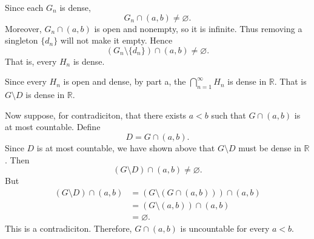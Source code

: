 \documentclass[12pt]{article}
\begin{document}
\begin{enumerate}[label=(\alph*)]
          Since each \( G_n \) is dense,
          \[
              G_n \cap (a,b) \neq \varnothing.
          \]
          Moreover, \( G_n \cap (a,b) \) is open and nonempty, so it is infinite. Thus removing a singleton \( \{d_n\} \) will not make it empty. Hence
          \[
              (G_n \setminus \{d_n\}) \cap (a,b) \neq \varnothing.
          \]
          That is, every \( H_n \) is dense.

          Since every \( H_n \) is open and dense, by part a, the \( \bigcap_{n=1}^{\infty} H_n \) is dense in \( \mathbb{R} \). That is \( G \setminus D \) is dense in \( \mathbb{R} \).

          Now suppose, for contradiciton, that there exists \( a < b \) such that \( G \cap (a,b) \) is at most countable. Define
          \[
              D = G \cap (a,b).
          \]
          Since \( D  \) is at most countable, we have shown above that \( G \setminus D \) must be dense in \( \mathbb{R} \). Then
          \[
              (G \setminus D) \cap (a,b) \neq \varnothing.
          \]
          But
          \[
              \begin{split}
                  (G \setminus D) \cap  (a,b)
                   & =  (G \setminus (G \cap (a,b))) \cap (a,b) \\
                   & = (G \setminus (a,b)) \cap (a,b)           \\
                   & = \varnothing.
              \end{split}
          \]
          This is a contradiciton. Therefore, \( G \cap (a,b) \) is uncountable for every \( a < b \).







\end{enumerate}
\end{document}
